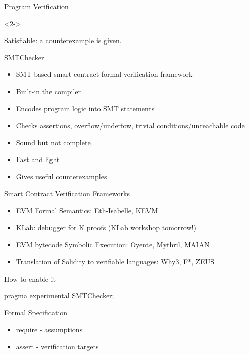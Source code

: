 \documentclass[aspectratio=169,10pt]{beamer}
\begin{document}
\begin{frame}[fragile]{Program Verification}
\begin{figure}
\begin{minipage}{.4\textwidth}
\end{minipage}
\end{figure}

\begin{onlyenv}<2->
\begin{center}
Satisfiable: a counterexample is given.
\end{center}
\end{onlyenv}

\end{frame}

\begin{frame}{SMTChecker}
\begin{itemize}
	\item SMT-based smart contract formal verification framework
	\item Built-in the compiler
	\item Encodes program logic into SMT statements
	\item Checks assertions, overflow/underfow, trivial conditions/unreachable code
	\item Sound but not complete
	\item Fast and light
	\item Gives useful counterexamples
\end{itemize}
\end{frame}

\begin{frame}{Smart Contract Verification Frameworks}
\begin{itemize}
	\item EVM Formal Semantics: Eth-Isabelle, KEVM
	\item KLab: debugger for K proofs (KLab workshop tomorrow!)
	\item EVM bytecode Symbolic Execution: Oyente, Mythril, MAIAN
	\item Translation of Solidity to verifiable languages: Why3, F*, ZEUS
\end{itemize}
\end{frame}

\begin{frame}{How to enable it}
\begin{center}
pragma experimental SMTChecker;
\end{center}
\end{frame}

\begin{frame}{Formal Specification}
\centering
\begin{itemize}
	\item require - assumptions
	\item assert - verification targets
\end{itemize}
\end{frame}
\end{document}
